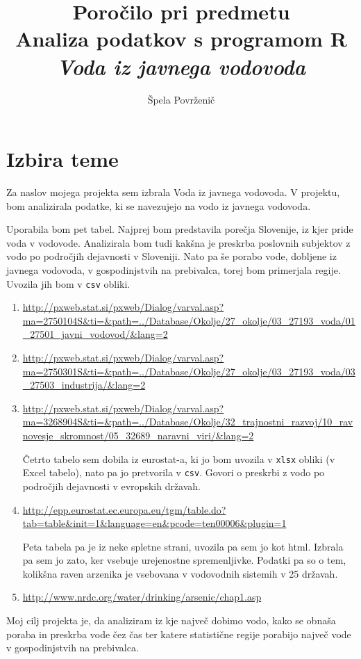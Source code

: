 \documentclass[11pt,a4paper]{article}
\begin{document}
\title{Poročilo pri predmetu \\
Analiza podatkov s programom R\\
\vspace{15mm}
\textbf{\emph{Voda iz javnega vodovoda}}}
\author{Špela Povrženič}
\maketitle


\newpage
\section{Izbira teme}
Za naslov mojega projekta sem izbrala Voda iz javnega vodovoda.
V projektu, bom analizirala podatke, ki se navezujejo na vodo iz javnega vodovoda. 

Uporabila bom pet tabel. 
Najprej bom predstavila porečja Slovenije, iz kjer pride voda v vodovode. Analizirala bom tudi kakšna je preskrba poslovnih subjektov z vodo po področjih dejavnosti v Sloveniji. Nato pa še porabo vode, dobljene iz javnega vodovoda, v gospodinjstvih na prebivalca, torej bom primerjala regije. Uvozila jih bom v \verb|csv| obliki.

\begin{enumerate} 
\item{\url{http://pxweb.stat.si/pxweb/Dialog/varval.asp?ma=2750104S&ti=&path=../Database/Okolje/27_okolje/03_27193_voda/01_27501_javni_vodovod/&lang=2}}

\item{\url{http://pxweb.stat.si/pxweb/Dialog/varval.asp?ma=2750301S&ti=&path=../Database/Okolje/27_okolje/03_27193_voda/03_27503_industrija/&lang=2}}

\item{\url{http://pxweb.stat.si/pxweb/Dialog/varval.asp?ma=3268904S&ti=&path=../Database/Okolje/32_trajnostni_razvoj/10_ravnovesje_skromnost/05_32689_naravni_viri/&lang=2}}

Četrto tabelo sem dobila iz eurostat-a, ki jo bom uvozila v \verb|xlsx| obliki (v Excel tabelo), nato pa jo pretvorila v \verb|csv|. Govori o preskrbi z vodo po področjih dejavnosti v evropskih državah.

\item{\url{http://epp.eurostat.ec.europa.eu/tgm/table.do?tab=table&init=1&language=en&pcode=ten00006&plugin=1}}

Peta tabela pa je iz neke spletne strani, uvozila pa sem jo kot html. Izbrala pa sem jo zato, ker vsebuje urejenostne spremenljivke. Podatki pa so o tem, kolikšna raven arzenika je vsebovana v vodovodnih sistemih v 25 državah.

\item{\url{http://www.nrdc.org/water/drinking/arsenic/chap1.asp}}
\end{enumerate}
Moj cilj projekta je, da analiziram iz kje največ dobimo vodo, kako se obnaša poraba in preskrba vode čez čas ter katere statistične regije porabijo največ vode v gospodinjstvih na prebivalca.
\end{document}
